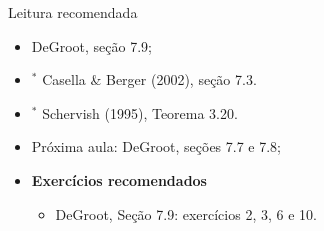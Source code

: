 \begin{frame}{Leitura recomendada}
\begin{itemize}
 \item[\faBook] DeGroot, seção 7.9;
 \item[\faBook] $^\ast$ Casella \& Berger (2002), seção 7.3.
 \item[\faBook] $^\ast$ Schervish (1995),  Teorema 3.20.
 \item[\faForward] Próxima aula: DeGroot, seções 7.7 e 7.8;
 \item {\large\textbf{Exercícios recomendados}}
 \begin{itemize}
  \item[\faBookmark] DeGroot, Seção 7.9: exercícios 2, 3, 6 e 10.
  \end{itemize}
 \end{itemize} 
\end{frame}
